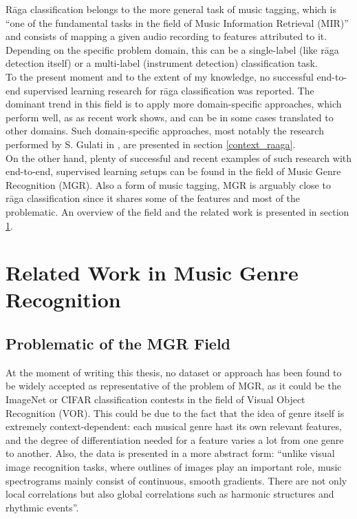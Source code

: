 R\=aga classification belongs to the more general task of music tagging, which is ``one of the fundamental tasks in the field of Music Information Retrieval (MIR)''\cite{stokowiec} and consists of mapping a given audio recording to features attributed to it. Depending on the specific problem domain, this can be a single-label (like r\=aga detection itself) or a multi-label (instrument detection) classification task.\\

To the present moment and to the extent of my knowledge, no successful end-to-end supervised learning research for r\=aga classification was reported. The dominant trend in this field is to apply more domain-specific approaches, which perform well, as as recent work shows, and can be in some cases translated to other domains. Such domain-specific approaches, most notably the research performed by S. Gulati in \cite{gulati}, are  presented in section \ref{context_raaga}.\\

On the other hand, plenty of successful and recent examples of such research with end-to-end, supervised learning setups can be found in the field of Music Genre Recognition (MGR). Also a form of music tagging, MGR is arguably close to r\=aga classification since it shares some of the features and most of the problematic. An overview of the field and the related work is presented in section \ref{context_mgr}.\\




\section{Related Work in Music Genre Recognition} \label{context_mgr}


\subsection{Problematic of the MGR Field}\label{mgr-problematic}

At the moment of writing this thesis, no dataset or approach has been found to be widely accepted as representative of the problem of MGR, as it could be the ImageNet or CIFAR classification contests in the field of Visual Object Recognition (VOR). This could be due to the fact that the idea of genre itself is extremely context-dependent: each musical genre hast its own relevant features, and the degree of differentiation needed for a feature varies a lot from one genre to another. Also, the data is presented in a more abstract form: ``unlike visual image recognition tasks, where outlines of images play an important role, music spectrograms mainly consist of continuous, smooth gradients. There are not only local correlations but also global correlations such as harmonic structures and rhythmic events''\cite{choi-explaining}.\\

